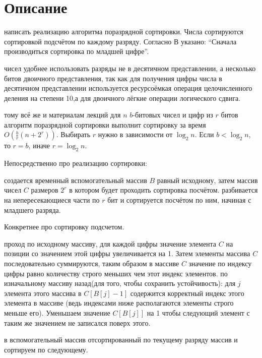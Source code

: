 \section{Описание}
 написать реализацию алгоритма поразрядной сортировки. Числа сортируются сортировкой подсчётом по каждому разряду. Согласно \cite{wikipedia_sort}  
В \cite{Kormen} указано: \enquote{Сначала производиться сортировка по младшей цифре}.

 чисел удобнее использовать разряды не в десятичном представлении, а несколько битов двоичного представления, так как для получения цифры числа в десятичном представлении используется ресурсоёмкая операция целочисленного деления на степени 10,а для двоичного лёгкие операции логического сдвига.

 тому всё же\cite{Kormen} и материалам лекций для $n$ $b$-битовых чисел и цифр из $r$ битов алгоритм поразрядной сортировки выполнит сортировку за время $O(\frac{b}{r}(n+2^r))$. 
Выбирать $r$ нужно в зависимости от $\log_2{n}$. Если $b<\log_2{n}$, то $r=b$, иначе $r=\log_2{n}$.


Непосредственно про реализацию сортировки:

 создается временный вспомогательный массив $B$ равный исходному, затем  массив чисел $C$ размеров $2^r$ в котором будет проходить сортировка посчётом.
 разбивается на непересекающиеся части по $r$ бит и сортируется посчётом по ним, начиная с младшего разряда. 

Конкретнее про сортировку подсчетом.

 проход по исходному массиву, для каждой цифры значение элемента $C$ на позиции со значением этой цифры увеличивается на 1.
Затем элементы массива $C$ последовательно суммируются, таким образом в массиве $C$ значение по индексу цифры равно количеству строго меньших чем этот индекс элементов.
 по изначальному массиву назад(для того, чтобы сохранить устойчивость): для $j$ элемента этого массива в $C[B[j]-1]$ содержится корректный индекс этого элемента в массиве (ведь индексами ниже располагаются элементы строго меньше его).
Уменьшаем значение $C[B[j]]$ на 1 чтобы следующий элемент с таким же значением не записался поверх этого. 

 в вспомогательный массив отсортированный по  текущему разряду массив и сортируем по следующему.
\pagebreak

